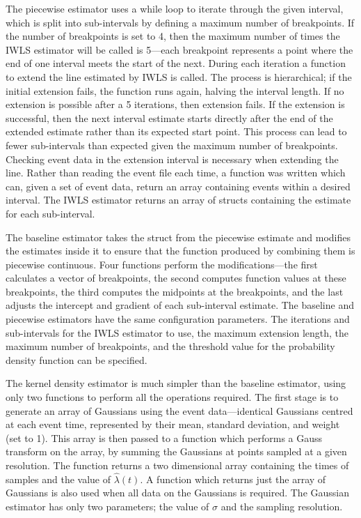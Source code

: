 \documentclass[a4paper,11pt]{article}
\begin{document}
   The piecewise estimator uses a while loop to iterate through the given
   interval, which is split into sub-intervals by defining a maximum number of
   breakpoints. If the number of breakpoints is set to 4, then the maximum
   number of times the IWLS estimator will be called is 5---each breakpoint
   represents a point where the end of one interval meets the start of the
   next. During each iteration a function to extend the line estimated by IWLS
   is called. The process is hierarchical; if the initial extension fails, the
   function runs again, halving the interval length. If no extension is possible
   after a 5 iterations, then extension fails. If the extension is successful,
   then the next interval estimate starts directly after the end of the extended
   estimate rather than its expected start point. This process can lead to fewer
   sub-intervals than expected given the maximum number of breakpoints. Checking
   event data in the extension interval is necessary when extending the
   line. Rather than reading the event file each time, a function was written
   which can, given a set of event data, return an array containing events
   within a desired interval. The IWLS estimator returns an array of structs
   containing the estimate for each sub-interval.

   The baseline estimator takes the struct from the piecewise estimate and
   modifies the estimates inside it to ensure that the function produced by
   combining them is piecewise continuous. Four functions perform the
   modifications---the first calculates a vector of breakpoints, the second
   computes function values at these breakpoints, the third computes the
   midpoints at the breakpoints, and the last adjusts the intercept and gradient
   of each sub-interval estimate. The baseline and piecewise estimators have the
   same configuration parameters. The iterations and sub-intervals for the IWLS
   estimator to use, the maximum extension length, the maximum number of
   breakpoints, and the threshold value for the probability density function can
   be specified.

   The kernel density estimator is much simpler than the baseline estimator,
   using only two functions to perform all the operations required. The first
   stage is to generate an array of Gaussians using the event data---identical
   Gaussians centred at each event time, represented by their mean, standard
   deviation, and weight (set to 1). This array is then passed to a function
   which performs a Gauss transform on the array, by summing the Gaussians at
   points sampled at a given resolution. The function returns a two dimensional
   array containing the times of samples and the value of $\hat{\lambda}(t)$. A
   function which returns just the array of Gaussians is also used when all data
   on the Gaussians is required. The Gaussian estimator has only two parameters;
   the value of $\sigma$ and the sampling resolution.
\end{document}
